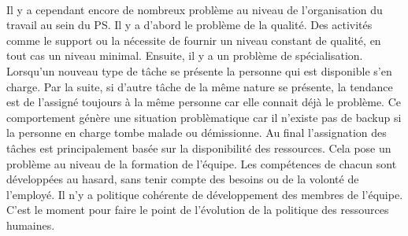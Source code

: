 \paragraph{}Il y a cependant encore de nombreux problème au niveau de l'organisation du travail au sein du PS. Il y a d'abord le problème de la qualité. Des activités comme le support ou la nécessite de fournir un niveau constant de qualité, en tout cas un niveau minimal. Ensuite, il y a un problème de spécialisation. Lorsqu'un nouveau type de tâche se présente la personne qui est disponible s'en charge. Par la suite, si d'autre tâche de la même nature se présente, la tendance est de l'assigné toujours à la même personne car elle connait déjà le problème. Ce comportement génère une situation problèmatique car il n'existe pas de backup si la personne en charge tombe malade ou démissionne. 
Au final l'assignation des tâches est principalement basée sur la disponibilité des ressources. Cela pose un problème au niveau de la formation de l'équipe. Les compétences de chacun sont développées au hasard, sans tenir compte des besoins ou de la volonté de l'employé. Il n'y a politique cohérente de développement des membres de l'équipe. C'est le moment pour faire le point de l'évolution de la politique des ressources humaines. 

